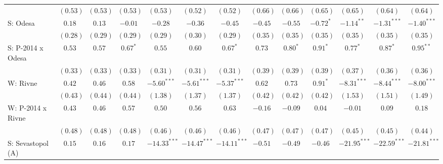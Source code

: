 \begin{table}
\begin{center}
\begin{tiny}
\begin{tabular}{l c c c c c c c c c c c c}
                            & $(0.53)$      & $(0.53)$     & $(0.53)$      & $(0.53)$       & $(0.52)$       & $(0.52)$       & $(0.66)$      & $(0.66)$    & $(0.65)$       & $(0.65)$       & $(0.64)$       & $(0.64)$       \\
S: Odesa                    & $0.18$        & $0.13$       & $-0.01$       & $-0.28$        & $-0.36$        & $-0.45$        & $-0.45$       & $-0.55$     & $-0.72^{*}$    & $-1.14^{**}$   & $-1.31^{***}$  & $-1.40^{***}$  \\
                            & $(0.28)$      & $(0.29)$     & $(0.29)$      & $(0.29)$       & $(0.30)$       & $(0.29)$       & $(0.35)$      & $(0.35)$    & $(0.35)$       & $(0.35)$       & $(0.35)$       & $(0.35)$       \\
S: P-2014 x Odesa           & $0.53$        & $0.57$       & $0.67^{*}$    & $0.55$         & $0.60$         & $0.67^{*}$     & $0.73$        & $0.80^{*}$  & $0.91^{*}$     & $0.77^{*}$     & $0.87^{*}$     & $0.95^{**}$    \\
                            & $(0.33)$      & $(0.33)$     & $(0.33)$      & $(0.31)$       & $(0.31)$       & $(0.31)$       & $(0.39)$      & $(0.39)$    & $(0.39)$       & $(0.37)$       & $(0.36)$       & $(0.36)$       \\
W: Rivne                    & $0.42$        & $0.46$       & $0.58$        & $-5.60^{***}$  & $-5.61^{***}$  & $-5.37^{***}$  & $0.62$        & $0.73$      & $0.91^{*}$     & $-8.31^{***}$  & $-8.44^{***}$  & $-8.00^{***}$  \\
                            & $(0.43)$      & $(0.44)$     & $(0.44)$      & $(1.38)$       & $(1.37)$       & $(1.37)$       & $(0.42)$      & $(0.42)$    & $(0.42)$       & $(1.53)$       & $(1.51)$       & $(1.49)$       \\
W: P-2014 x Rivne           & $0.43$        & $0.46$       & $0.57$        & $0.50$         & $0.56$         & $0.63$         & $-0.16$       & $-0.09$     & $0.04$         & $-0.01$        & $0.09$         & $0.18$         \\
                            & $(0.48)$      & $(0.48)$     & $(0.48)$      & $(0.46)$       & $(0.46)$       & $(0.46)$       & $(0.47)$      & $(0.47)$    & $(0.47)$       & $(0.45)$       & $(0.45)$       & $(0.44)$       \\
S: Sevastopol (A)           & $0.15$        & $0.16$       & $0.17$        & $-14.33^{***}$ & $-14.47^{***}$ & $-14.11^{***}$ & $-0.51$       & $-0.49$     & $-0.46$        & $-21.95^{***}$ & $-22.59^{***}$ & $-21.81^{***}$ \\

\end{tabular}
\end{tiny}
\end{center}
\end{table}
